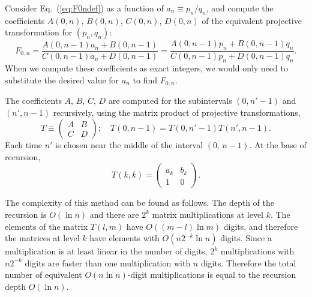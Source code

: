 \documentclass{llncs}
\begin{document}
Consider Eq.~(\ref{eq:F0ndef}) as a function of $a_{n}\equiv p_{n}/q_{n}$,
and compute the coefficients $A\left(0,n\right)$, $B\left(0,n\right)$,
$C\left(0,n\right)$, $D\left(0,n\right)$ of the equivalent projective
transformation for $\left(p_{n},q_{n}\right)$:\begin{equation}
F_{0,n}=\frac{A\left(0,n-1\right)a_{n}+B\left(0,n-1\right)}{C\left(0,n-1\right)a_{n}+D\left(0,n-1\right)}=\frac{A\left(0,n-1\right)p_{n}+B\left(0,n-1\right)q_{n}}{C\left(0,n-1\right)p_{n}+D\left(0,n-1\right)q_{n}}.\end{equation}
When we compute these coefficients as exact integers, we would only
need to substitute the desired value for $a_{n}$ to find $F_{0,n}$.

The coefficients $A$, $B$, $C$, $D$ are computed for the subintervals
$\left(0,n'-1\right)$ and $\left(n',n-1\right)$ recursively, using
the matrix product of projective transformations,\begin{equation}
T\equiv \left(\begin{array}{cc}
 A & B\\
 C & D\end{array}
\right);\quad T\left(0,n-1\right)=T\left(0,n'-1\right)T\left(n',n-1\right).\end{equation}
Each time $n'$ is chosen near the middle of the interval $\left(0,\, n-1\right)$.
At the base of recursion,\begin{equation}
T\left(k,k\right)=\left(\begin{array}{cc}
 a_{k} & b_{k}\\
 1 & 0\end{array}
\right).\end{equation}


The complexity of this method can be found as follows. The depth of
the recursion is $O\left(\ln n\right)$ and there are $2^{k}$ matrix
multiplications at level $k$. The elements of the matrix $T\left(l,m\right)$
have $O\left(\left(m-l\right)\ln m\right)$ digits, and therefore
the matrices at level $k$ have elements with $O\left(n2^{-k}\ln n\right)$
digits. Since a multiplication is at least linear in the number of
digits, $2^{k}$ multiplications with $n2^{-k}$ digits are faster
than one multiplication with $n$ digits. Therefore the total number
of equivalent $O(n\ln n)$-digit multiplications is equal to the recursion
depth $O\left(\ln n\right)$.
\end{document}
